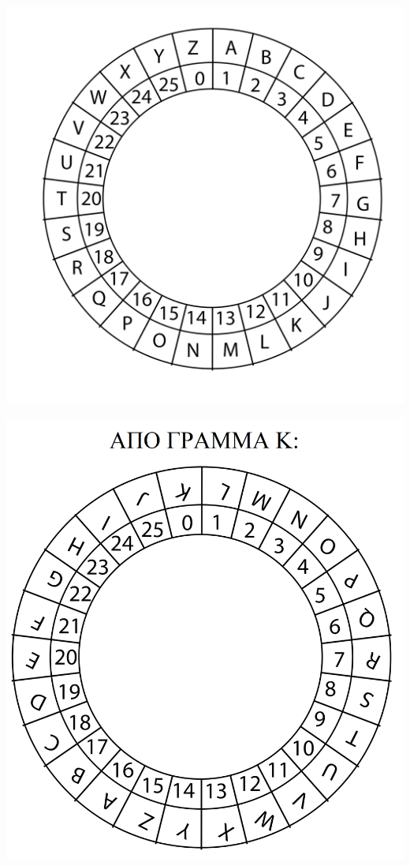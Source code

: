 \documentclass[a4paper, 11pt]{article}
\begin{document}
\centerline{\includegraphics[scale=0.35]{disk.png}} 
\includegraphics[scale=0.08]{diskwithk.png}  
\end{document}
